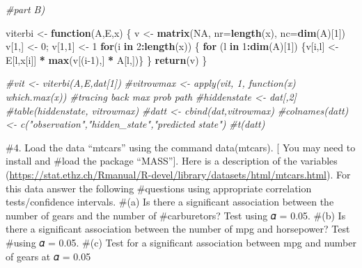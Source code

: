 \documentclass[
]{article}
\newenvironment{Shaded}{\begin{snugshade}}{\end{snugshade}}
\newcommand{\CommentTok}[1]{\textcolor[rgb]{0.56,0.35,0.01}{\textit{#1}}}
\newcommand{\ControlFlowTok}[1]{\textcolor[rgb]{0.13,0.29,0.53}{\textbf{#1}}}
\newcommand{\DataTypeTok}[1]{\textcolor[rgb]{0.13,0.29,0.53}{#1}}
\newcommand{\DecValTok}[1]{\textcolor[rgb]{0.00,0.00,0.81}{#1}}
\newcommand{\KeywordTok}[1]{\textcolor[rgb]{0.13,0.29,0.53}{\textbf{#1}}}
\newcommand{\NormalTok}[1]{#1}
\newcommand{\OperatorTok}[1]{\textcolor[rgb]{0.81,0.36,0.00}{\textbf{#1}}}
\newcommand{\OtherTok}[1]{\textcolor[rgb]{0.56,0.35,0.01}{#1}}
\newcommand{\StringTok}[1]{\textcolor[rgb]{0.31,0.60,0.02}{#1}}
\begin{document}
\begin{Shaded}
\begin{Highlighting}[]
\CommentTok{#part B)}

\NormalTok{viterbi <-}\StringTok{ }\ControlFlowTok{function}\NormalTok{(A,E,x) \{}
\NormalTok{ v <-}\StringTok{ }\KeywordTok{matrix}\NormalTok{(}\OtherTok{NA}\NormalTok{, }\DataTypeTok{nr=}\KeywordTok{length}\NormalTok{(x), }\DataTypeTok{nc=}\KeywordTok{dim}\NormalTok{(A)[}\DecValTok{1}\NormalTok{])}
\NormalTok{ v[}\DecValTok{1}\NormalTok{,] <-}\StringTok{ }\DecValTok{0}\NormalTok{; v[}\DecValTok{1}\NormalTok{,}\DecValTok{1}\NormalTok{] <-}\StringTok{ }\DecValTok{1}
 \ControlFlowTok{for}\NormalTok{(i }\ControlFlowTok{in} \DecValTok{2}\OperatorTok{:}\KeywordTok{length}\NormalTok{(x)) \{}
 \ControlFlowTok{for}\NormalTok{ (l }\ControlFlowTok{in} \DecValTok{1}\OperatorTok{:}\KeywordTok{dim}\NormalTok{(A)[}\DecValTok{1}\NormalTok{]) \{v[i,l] <-}\StringTok{ }\NormalTok{E[l,x[i]] }\OperatorTok{*}\StringTok{ }\KeywordTok{max}\NormalTok{(v[(i}\DecValTok{-1}\NormalTok{),] }\OperatorTok{*}\StringTok{ }\NormalTok{A[l,])\}}
\NormalTok{ \}}
 \KeywordTok{return}\NormalTok{(v)}
\NormalTok{\}}



\CommentTok{#vit <- viterbi(A,E,dat[1])}
\CommentTok{#vitrowmax <- apply(vit, 1, function(x) which.max(x)) #tracing back max prob path}
\CommentTok{#hiddenstate <- dat[,2]}
\CommentTok{#table(hiddenstate, vitrowmax)}
\CommentTok{#datt <- cbind(dat,vitrowmax)}
\CommentTok{#colnames(datt) <- c("observation","hidden_state","predicted state")}
\CommentTok{#t(datt)}
\end{Highlighting}
\end{Shaded}

\#4. Load the data ``mtcars'' using the command data(mtcars). {[} You
may need to install and \#load the package ``MASS''{]}. Here is a
description of the variables
(\url{https://stat.ethz.ch/Rmanual/R-devel/library/datasets/html/mtcars.html}).
For this data answer the following \#questions using appropriate
correlation tests/confidence intervals. \#(a) Is there a significant
association between the number of gears and the number of \#carburetors?
Test using 𝛼 = 0.05. \#(b) Is there a significant association between
the number of mpg and horsepower? Test \#using 𝛼 = 0.05. \#(c) Test for
a significant association between mpg and number of gears at 𝛼 = 0.05

\begin{Shaded}
\end{Shaded}
\end{document}
